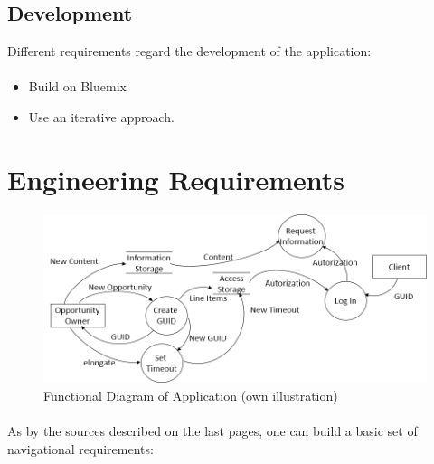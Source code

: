 \subsection{Development}
Different requirements regard the development of the application: 
\paragraph{}
\begin{itemize}
    \item Build on Bluemix
    \item Use an iterative approach.
\end{itemize}

\section{Engineering Requirements}

\begin{figure}[H]
    \centering
    \includegraphics[width=\textwidth]{img/diagrams/FunctionDiagram.png}
    \caption[Functional Diagram of Application]{Functional Diagram of Application (own illustration)}
    \label{fig:}
\end{figure}

\paragraph{}
As by the sources described on the last pages, one can build a basic set of navigational requirements:
